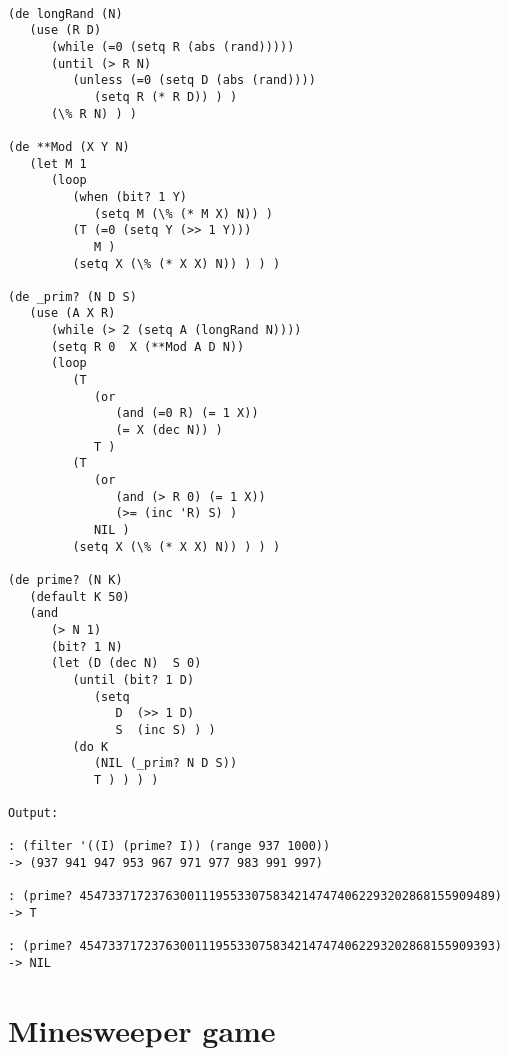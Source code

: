 \begin{verbatim}

(de longRand (N)
   (use (R D)
      (while (=0 (setq R (abs (rand)))))
      (until (> R N)
         (unless (=0 (setq D (abs (rand))))
            (setq R (* R D)) ) )
      (\% R N) ) )

(de **Mod (X Y N)
   (let M 1
      (loop
         (when (bit? 1 Y)
            (setq M (\% (* M X) N)) )
         (T (=0 (setq Y (>> 1 Y)))
            M )
         (setq X (\% (* X X) N)) ) ) )

(de _prim? (N D S)
   (use (A X R)
      (while (> 2 (setq A (longRand N))))
      (setq R 0  X (**Mod A D N))
      (loop
         (T
            (or
               (and (=0 R) (= 1 X))
               (= X (dec N)) )
            T )
         (T
            (or
               (and (> R 0) (= 1 X))
               (>= (inc 'R) S) )
            NIL )
         (setq X (\% (* X X) N)) ) ) )

(de prime? (N K)
   (default K 50)
   (and
      (> N 1)
      (bit? 1 N)
      (let (D (dec N)  S 0)
         (until (bit? 1 D)
            (setq
               D  (>> 1 D)
               S  (inc S) ) )
         (do K
            (NIL (_prim? N D S))
            T ) ) ) )

Output:

: (filter '((I) (prime? I)) (range 937 1000))
-> (937 941 947 953 967 971 977 983 991 997)

: (prime? 4547337172376300111955330758342147474062293202868155909489)
-> T

: (prime? 4547337172376300111955330758342147474062293202868155909393)
-> NIL

\end{verbatim}

\section*{Minesweeper game}

